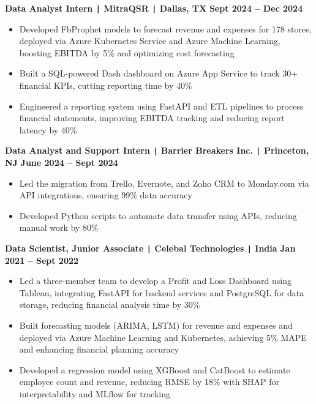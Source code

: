 \documentclass[10pt]{article}
\begin{document}
\vspace{-0.2cm}
\noindent
\textbf{Data Analyst Intern \texttt{|} MitraQSR \texttt{|} Dallas, TX} \hfill \textbf{Sept 2024 -- Dec 2024} 
\vspace{-0.15cm}
\begin{itemize}[leftmargin=0.5cm, itemsep=0pt]

    \item Developed FbProphet models to forecast revenue and expenses for 178 stores, deployed via Azure Kubernetes Service and Azure Machine Learning, boosting EBITDA by 5\% and optimizing cost forecasting

    \item Built a SQL-powered Dash dashboard on Azure App Service to track 30+ financial KPIs, cutting reporting time by 40\%

    \item Engineered a reporting system using FastAPI and ETL pipelines to process financial statements, improving EBITDA tracking and reducing report latency by 40\%

\end{itemize}

\vspace{-0.2cm}
\noindent
\textbf{Data Analyst and Support Intern \texttt{|} Barrier Breakers Inc. \texttt{|} Princeton, NJ} \hfill \textbf{June 2024 -- Sept 2024} 
\vspace{-0.15cm}
\begin{itemize}[leftmargin=0.5cm, itemsep=0pt]

    \item Led the migration from Trello, Evernote, and Zoho CRM to Monday.com via API integrations, ensuring 99\% data accuracy

    \item Developed Python scripts to automate data transfer using APIs, reducing manual work by 80\%

\end{itemize}

\vspace{-0.2cm}
\noindent
\textbf{Data Scientist, Junior Associate \texttt{|} Celebal Technologies \texttt{|} India} \hfill \textbf{Jan 2021 -- Sept 2022} 
\vspace{-0.15cm}
\begin{itemize}[leftmargin=0.5cm, itemsep=0pt]

    \item Led a three-member team to develop a Profit and Loss Dashboard using Tableau, integrating FastAPI for backend services and PostgreSQL for data storage, reducing financial analysis time by 30\%

    \item Built forecasting models (ARIMA, LSTM) for revenue and expenses and deployed via Azure Machine Learning and Kubernetes, achieving 5\% MAPE and enhancing financial planning accuracy

    \item Developed a regression model using XGBoost and CatBoost to estimate employee count and revenue, reducing RMSE by 18\% with SHAP for interpretability and MLflow for tracking

\end{itemize}
\end{document}

